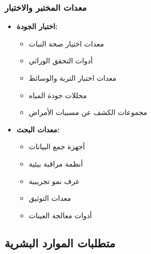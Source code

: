 \subsubsection{معدات المختبر والاختبار}
\begin{itemize}
    \item \textbf{اختبار الجودة:}
    \begin{itemize}
        \item معدات اختبار صحة النبات
        \item أدوات التحقق الوراثي
        \item معدات اختبار التربة والوسائط
        \item محللات جودة المياه
        \item مجموعات الكشف عن مسببات الأمراض
    \end{itemize}
    
    \item \textbf{معدات البحث:}
    \begin{itemize}
        \item أجهزة جمع البيانات
        \item أنظمة مراقبة بيئية
        \item غرف نمو تجريبية
        \item معدات التوثيق
        \item أدوات معالجة العينات
    \end{itemize}
\end{itemize}

\subsection{متطلبات الموارد البشرية}

